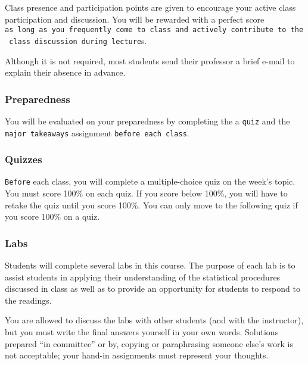 \documentclass[
  letterpaper,
  DIV=11,
  numbers=noendperiod]{scrartcl}
\begin{document}
Class presence and participation points are given to encourage your
active class participation and discussion. You will be rewarded with a
perfect score
\texttt{as\ long\ as\ you\ frequently\ come\ to\ class\ and\ actively\ contribute\ to\ the\ class\ discussion\ during\ lecture}s.

Although it is not required, most students send their professor a brief
e-mail to explain their absence in advance.

\hypertarget{preparedness}{%
\subsubsection{Preparedness}\label{preparedness}}

You will be evaluated on your preparedness by completing the a
\texttt{quiz} and the \texttt{major\ takeaways} assignment
\texttt{before\ each\ class}.

\hypertarget{sec-quizzes}{%
\subsubsection{Quizzes}\label{sec-quizzes}}

\texttt{Before} each class, you will complete a multiple-choice quiz on
the week's topic. You must score 100\% on each quiz. If you score below
100\%, you will have to retake the quiz until you score 100\%. You can
only move to the following quiz if you score 100\% on a quiz.

\hypertarget{labs}{%
\subsubsection{Labs}\label{labs}}

Students will complete several labs in this course. The purpose of each
lab is to assist students in applying their understanding of the
statistical procedures discussed in class as well as to provide an
opportunity for students to respond to the readings.

\begin{tcolorbox}[enhanced jigsaw, toptitle=1mm, left=2mm, colframe=quarto-callout-warning-color-frame, titlerule=0mm, opacityback=0, colbacktitle=quarto-callout-warning-color!10!white, opacitybacktitle=0.6, leftrule=.75mm, toprule=.15mm, bottomrule=.15mm, rightrule=.15mm, bottomtitle=1mm, breakable, title=\textcolor{quarto-callout-warning-color}{\faExclamationTriangle}\hspace{0.5em}{Warning}, coltitle=black, arc=.35mm, colback=white]

You are allowed to discuss the labs with other students (and with the
instructor), but you must write the final answers yourself in your own
words. Solutions prepared ``in committee'' or by, copying or
paraphrasing someone else's work is not acceptable; your hand-in
assignments must represent your thoughts.

\end{tcolorbox}
\end{document}
